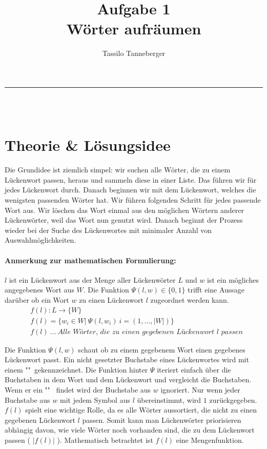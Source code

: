 \documentclass{article}
\title{Aufgabe 1\\Wörter aufräumen}
\author{Tassilo Tanneberger}
\makeatletter
\newcommand{\linia}{\rule{\linewidth}{1pt}}
\renewcommand{\maketitle}{\begin{center}
\Huge \@title\end{center}
\linia\\
{\large\@author\hfill\@date\\}}
\makeatother
\begin{document}
\maketitle


\section*{Theorie \& Lösungsidee}

Die Grundidee ist ziemlich simpel: wir suchen alle Wörter, die zu einem Lückenwort passen, heraus und sammeln diese in einer Liste. Das führen wir für jedes Lückenwort durch. Danach beginnen wir mit dem Lückenwort, welches die wenigsten passenden Wörter hat. Wir führen folgenden Schritt für jedes passende Wort aus. Wir löschen das Wort einmal aus den möglichen Wörtern anderer Lückenwörter, weil das Wort nun genutzt wird. Danach beginnt der Prozess wieder bei der Suche des Lückenwortes mit minimaler Anzahl von Auswahlmöglichkeiten.

\paragraph*{Anmerkung zur mathematischen Formulierung: } $ l $ ist ein Lückenwort aus der Menge aller Lückenwörter $ L $ und $ w $ ist ein mögliches angegebenes Wort aus $ W $. Die Funktion $ \Psi (l, w) \in \lbrace 0, 1 \rbrace $ trifft eine Aussage darüber ob ein Wort $ w $ zu einen Lückenwort $ l $ zugeordnet werden kann.
\begin{align*}
	&f(l) : L \rightarrow \lbrace W \rbrace\\
	&f(l) = \lbrace w_i \in W \vert\ \Psi (l, w_i)\ i = (1, \dots, \vert W \vert ) \rbrace \\
	&f(l) \ \dots \ \textit{Alle Wörter, die zu einen gegebenen Lückenwort } l \textit{ passen}
\end{align*}

\noindent Die Funktion $ \Psi (l, w) $ schaut ob zu einem gegebenem Wort einen gegebenes Lückenwort passt. Ein nicht gesetzter Buchstabe eines Lückenwortes wird mit einem "\textunderscore "\ gekennzeichnet. Die Funktion hinter $ \Psi $ iteriert einfach über die Buchstaben in dem Wort und dem Lückenwort und vergleicht die Buchstaben. Wenn er ein "\textunderscore " \ findet wird der Buchstabe aus $ w $ ignoriert. Nur wenn jeder Buchstabe aus $ w $ mit jedem Symbol aus $ l $ übereinstimmt, wird $ 1 $ zurückgegeben. \\

\noindent $ f(l) $ spielt eine wichtige Rolle, da es alle Wörter aussortiert, die nicht zu einen gegebenen Lückenwort $ l $ passen. Somit kann man Lückenwörter priorisieren abhängig davon, wie viele Wörter noch vorhanden sind, die zu dem Lückenwort passen ( $ \vert f(l) \vert $ ). Mathematisch betrachtet ist $ f(l) $ eine Mengenfunktion.\\
\end{document}
